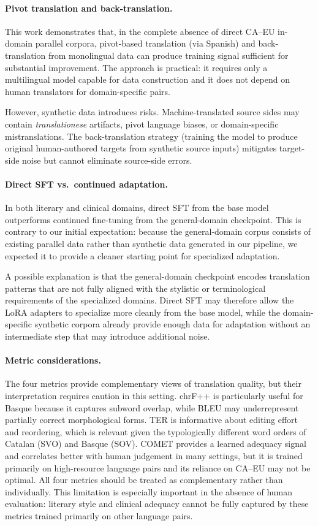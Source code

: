 \documentclass[11pt,a4paper]{article}
\begin{document}
\paragraph{Pivot translation and back-translation.}
This work demonstrates that, in the complete absence of direct
CA--EU in-domain parallel corpora, pivot-based translation
(via Spanish) and back-translation from monolingual data
can produce training signal sufficient for substantial improvement.
The approach is practical: it requires only a multilingual
model capable for data construction and it does not depend on human translators
for domain-specific pairs.

However, synthetic data introduces risks. Machine-translated source
sides may contain \textit{translationese} artifacts, pivot language biases,
or domain-specific mistranslations. The back-translation
strategy (training the model to produce original human-authored
targets from synthetic source inputs) mitigates target-side noise
but cannot eliminate source-side errors.


\paragraph{Direct SFT vs.\ continued adaptation.}
In both literary and clinical domains, direct SFT from the base model
outperforms continued fine-tuning from the general-domain checkpoint.
This is contrary to our initial expectation: because the general-domain
corpus consists of existing parallel data rather than synthetic data
generated in our pipeline, we expected it to provide a cleaner starting
point for specialized adaptation.

A possible explanation is that the general-domain checkpoint encodes
translation patterns that are not fully aligned with the stylistic or
terminological requirements of the specialized domains. Direct SFT may
therefore allow the LoRA adapters to specialize more cleanly from the
base model, while the domain-specific synthetic corpora already provide
enough data for adaptation without an intermediate step that may introduce additional noise.

\paragraph{Metric considerations.}
The four metrics provide complementary views of translation quality, but
their interpretation requires caution in this setting. chrF++ is
particularly useful for Basque because it captures subword overlap, while
BLEU may underrepresent partially correct morphological forms. TER is
informative about editing effort and reordering, which is relevant given
the typologically different word orders of Catalan (SVO) and Basque
(SOV). 
COMET provides a learned adequacy signal and correlates better
with human judgement in many settings, but it is trained primarily on
high-resource language pairs and its reliance on CA--EU may not
be optimal. All four metrics should be treated as complementary rather
than individually. This limitation is especially important in
the absence of human evaluation: literary style and clinical adequacy
cannot be fully captured by these metrics trained primarily on other language pairs.
\end{document}
